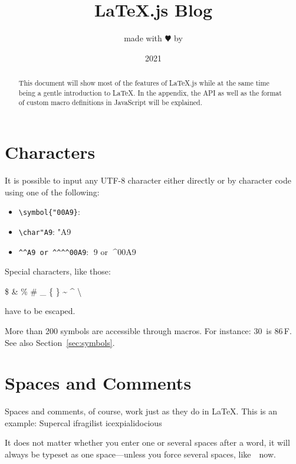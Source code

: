 \documentclass{article}
\title{\LaTeX.js Blog}
\author{made with $\varheartsuit$ by }
\date{2021}
\begin{document}
    \maketitle


    \begin{abstract}
        This document will show most of the features of \LaTeX.js while at the same time being a gentle introduction to \LaTeX.
        In the appendix, the API as well as the format of custom macro definitions in JavaScript will be explained.
    \end{abstract}


    \section{Characters}

    It is possible to input any UTF-8 character either directly or by character code
    using one of the following:

    \begin{itemize}
        \item \texttt{\textbackslash symbol\{"00A9\}}: 
        \item \verb|\char"A9|: \char"A9
        \item \verb|^^A9 or ^^^^00A9|: ^^A9 or ^^^^00A9
    \end{itemize}

    \bigskip

    \noindent
    Special characters, like those:
    \begin{center}
        \$ \& \% \# \_ \{ \} \~{} \^{} \textbackslash %
    \end{center}
%
    have to be escaped.

    More than 200 symbols are accessible through macros. For instance: 30\,\textcelsius{} is
    86\,\textdegree{}F. See also Section~\ref{sec:symbols}.


    \section{Spaces and Comments}

    Spaces and comments, of course, work just as they do in \LaTeX.
    This is an            %
    example: Supercal%
    ifragilist%
    icexpialidocious

    It does not matter whether you enter one or several spaces after a word, it
    will always be typeset as one space---unless you force several spaces, like\ \ now.
\end{document}
